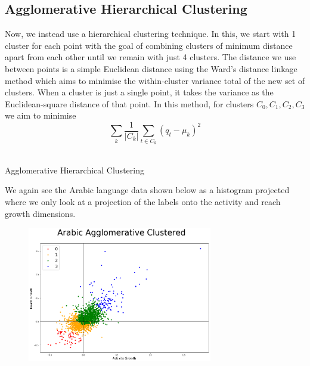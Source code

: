 \documentclass[12pt]{article}
\makeatletter
\def\BState{\State\hskip-\ALG@thistlm}
\makeatother
\begin{document}
\subsection{Agglomerative Hierarchical Clustering}
Now, we instead use a hierarchical clustering technique. In this, we start with 1 cluster for each point with the goal of combining clusters of minimum distance apart from each other until we remain with just 4 clusters. The distance we use between points is a simple Euclidean distance using the Ward's distance linkage method which aims to minimise the within-cluster variance total of the new set of clusters. When a cluster is just a single point, it takes the variance as the Euclidean-square distance of that point. In this method, for clusters $C_0,C_1,C_2,C_3$ we aim to minimise $$\sum_k \frac{1}{\lvert C_k \rvert}\sum_{t \in C_k} (q_t - \mu_k)^2$$\\
\FloatBarrier
\begin{algorithm}
\caption{Agglomerative Hierarchical Clustering}
\end{algorithm}
\FloatBarrier
We again see the Arabic language data shown below as a histogram projected where we only look at a projection of the labels onto the activity and reach growth dimensions.
\FloatBarrier
\begin{figure}[hbtp]\centering
\includegraphics[width=0.72\textwidth,clip]{images/ArabicWardMethod.png}
\end{figure}
\end{document}
